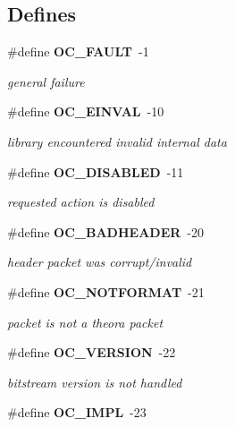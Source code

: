 \subsection*{Defines}
\begin{CompactItemize}
\item 
\#define {\bf OC\_\-FAULT}\ -1\label{theora_8h_a0}

\begin{CompactList}\small\item\em general failure \item\end{CompactList}\item 
\#define {\bf OC\_\-EINVAL}\ -10\label{theora_8h_a1}

\begin{CompactList}\small\item\em library encountered invalid internal data \item\end{CompactList}\item 
\#define {\bf OC\_\-DISABLED}\ -11\label{theora_8h_a2}

\begin{CompactList}\small\item\em requested action is disabled \item\end{CompactList}\item 
\#define {\bf OC\_\-BADHEADER}\ -20\label{theora_8h_a3}

\begin{CompactList}\small\item\em header packet was corrupt/invalid \item\end{CompactList}\item 
\#define {\bf OC\_\-NOTFORMAT}\ -21\label{theora_8h_a4}

\begin{CompactList}\small\item\em packet is not a theora packet \item\end{CompactList}\item 
\#define {\bf OC\_\-VERSION}\ -22\label{theora_8h_a5}

\begin{CompactList}\small\item\em bitstream version is not handled \item\end{CompactList}\item 
\#define {\bf OC\_\-IMPL}\ -23\label{theora_8h_a6}


\end{CompactItemize}
